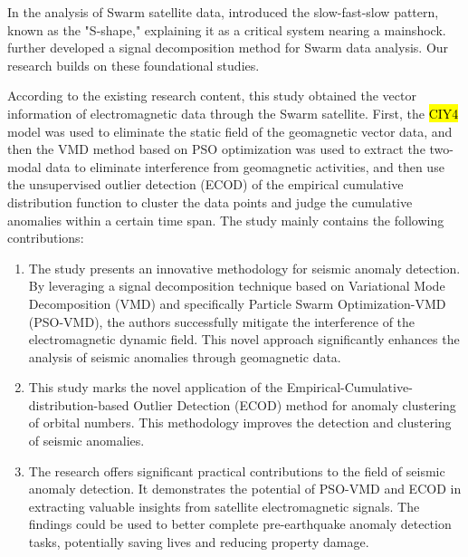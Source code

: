 \documentclass[3p,authoryear,preprint,12pt]{elsarticle}
\begin{document}
In the analysis of Swarm satellite data, \citep{desantisPotentialEarthquakePrecursory2017} introduced the slow-fast-slow pattern, known as the "S-shape," explaining it as a critical system nearing a mainshock. \citep{fanAnalysisSwarmSatellite2022a} further developed a signal decomposition method for Swarm data analysis. Our research builds on these foundational studies.

{According to the existing research content, this study obtained the vector information of electromagnetic data through the Swarm satellite. First, the \hl{CIY4} model was used to eliminate the static field of the geomagnetic vector data, and then the VMD method based on PSO optimization was used to extract the two-modal data to eliminate interference from geomagnetic activities, and then use the unsupervised outlier detection (ECOD) of the empirical cumulative distribution function to cluster the data points and judge the cumulative anomalies within a certain time span.}
The study mainly contains the following contributions:
\begin{enumerate}
	\item The study presents an innovative methodology for seismic anomaly detection. By leveraging a signal decomposition technique based on Variational Mode Decomposition (VMD) and specifically Particle Swarm Optimization-VMD (PSO-VMD), the authors successfully mitigate the interference of the electromagnetic dynamic field. This novel approach significantly enhances the analysis of seismic anomalies through geomagnetic data.
	\item This study marks the novel application of the Empirical-Cumulative-distribution-based Outlier Detection (ECOD) method for anomaly clustering of orbital numbers. This methodology improves the detection and clustering of seismic anomalies.

	\item The research offers significant practical contributions to the field of seismic anomaly detection. It demonstrates the potential of PSO-VMD and ECOD in extracting valuable insights from satellite electromagnetic signals. {The findings could be used to better complete pre-earthquake anomaly detection tasks, potentially saving lives and reducing property damage.}
\end{enumerate}
\end{document}
